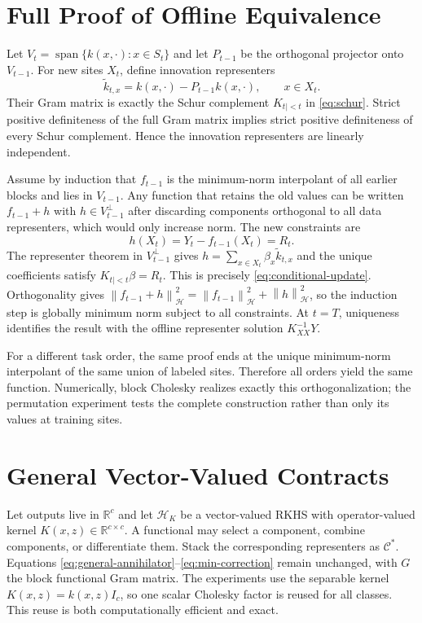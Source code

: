 \documentclass{vanish_ieee}
\theoremstyle{definition}
\newcommand{\Hcal}{\mathcal{H}}
\newcommand{\Cop}{\mathcal{C}}
\newcommand{\R}{\mathbb{R}}
\newcommand{\norm}[1]{\left\lVert#1\right\rVert}
\begin{document}
\appendix

\section{Full Proof of Offline Equivalence}
\label{app:proofs}

Let $V_t=\operatorname{span}\{k(x,\cdot):x\in S_t\}$ and let $P_{t-1}$ be the orthogonal projector onto $V_{t-1}$.  For new sites $X_t$, define innovation representers
\begin{equation}
\widetilde k_{t,x}=k(x,\cdot)-P_{t-1}k(x,\cdot),\qquad x\in X_t.
\end{equation}
Their Gram matrix is exactly the Schur complement $K_{t\mid<t}$ in \eqref{eq:schur}.  Strict positive definiteness of the full Gram matrix implies strict positive definiteness of every Schur complement.  Hence the innovation representers are linearly independent.

Assume by induction that $f_{t-1}$ is the minimum-norm interpolant of all earlier blocks and lies in $V_{t-1}$.  Any function that retains the old values can be written $f_{t-1}+h$ with $h\in V_{t-1}^{\perp}$ after discarding components orthogonal to all data representers, which would only increase norm.  The new constraints are
\begin{equation}
h(X_t)=Y_t-f_{t-1}(X_t)=R_t.
\end{equation}
The representer theorem in $V_{t-1}^{\perp}$ gives
$h=\sum_{x\in X_t}\beta_x\widetilde k_{t,x}$ and the unique coefficients satisfy $K_{t\mid<t}\beta=R_t$.  This is precisely \eqref{eq:conditional-update}.  Orthogonality gives
$\norm{f_{t-1}+h}_{\Hcal}^2=\norm{f_{t-1}}_{\Hcal}^2+\norm{h}_{\Hcal}^2$,
so the induction step is globally minimum norm subject to all constraints.  At $t=T$, uniqueness identifies the result with the offline representer solution $K_{XX}^{-1}Y$.

For a different task order, the same proof ends at the unique minimum-norm interpolant of the same union of labeled sites.  Therefore all orders yield the same function.  Numerically, block Cholesky realizes exactly this orthogonalization; the permutation experiment tests the complete construction rather than only its values at training sites.

\section{General Vector-Valued Contracts}

Let outputs live in $\R^c$ and let $\Hcal_K$ be a vector-valued RKHS with operator-valued kernel $K(x,z)\in\R^{c\times c}$.  A functional may select a component, combine components, or differentiate them.  Stack the corresponding representers as $\Cop^*$.  Equations \eqref{eq:general-annihilator}--\eqref{eq:min-correction} remain unchanged, with $G$ the block functional Gram matrix.  The experiments use the separable kernel $K(x,z)=k(x,z)I_c$, so one scalar Cholesky factor is reused for all classes.  This reuse is both computationally efficient and exact.
\end{document}
